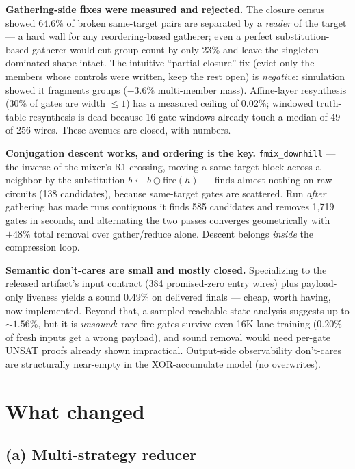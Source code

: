 \documentclass[11pt]{article}
\newcommand{\code}[1]{\texttt{#1}}
\begin{document}
\textbf{Gathering-side fixes were measured and rejected.} The closure census showed 64.6\% of broken same-target pairs are separated by a \emph{reader} of the target --- a hard wall for any reordering-based gatherer; even a perfect substitution-based gatherer would cut group count by only 23\% and leave the singleton-dominated shape intact. The intuitive ``partial closure'' fix (evict only the members whose controls were written, keep the rest open) is \emph{negative}: simulation showed it fragments groups ($-3.6\%$ multi-member mass). Affine-layer resynthesis (30\% of gates are width $\le 1$) has a measured ceiling of 0.02\%; windowed truth-table resynthesis is dead because 16-gate windows already touch a median of 49 of 256 wires. These avenues are closed, with numbers.

\textbf{Conjugation descent works, and ordering is the key.} \code{fmix\_downhill} --- the inverse of the mixer's R1 crossing, moving a same-target block across a neighbor by the substitution $b \leftarrow b \oplus \mathrm{fire}(h)$ --- finds almost nothing on raw circuits (138 candidates), because same-target gates are scattered. Run \emph{after} gathering has made runs contiguous it finds 585 candidates and removes 1{,}719 gates in seconds, and alternating the two passes converges geometrically with $+48\%$ total removal over gather/reduce alone. Descent belongs \emph{inside} the compression loop.

\textbf{Semantic don't-cares are small and mostly closed.} Specializing to the released artifact's input contract (384 promised-zero entry wires) plus payload-only liveness yields a sound 0.49\% on delivered finals --- cheap, worth having, now implemented. Beyond that, a sampled reachable-state analysis suggests up to ${\sim}1.56\%$, but it is \emph{unsound}: rare-fire gates survive even 16K-lane training (0.20\% of fresh inputs get a wrong payload), and sound removal would need per-gate UNSAT proofs already shown impractical. Output-side observability don't-cares are structurally near-empty in the XOR-accumulate model (no overwrites).

\section{What changed}

\subsection*{(a) Multi-strategy reducer}
\end{document}
